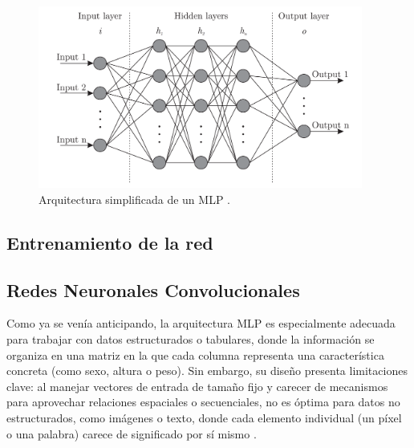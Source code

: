 \begin{figure}[h]
    \centering
    \includegraphics[width=0.95\textwidth]{capitulos/cap_02/imagenes/neural_network.png}
    \caption{Arquitectura simplificada de un MLP \cite{bre2017}.} 
    \label{fig:neural_network}
\end{figure}


\subsection{Entrenamiento de la red}



\subsection{Redes Neuronales Convolucionales}

Como ya se venía anticipando, la arquitectura MLP es especialmente adecuada para trabajar con datos 
estructurados o tabulares, donde la información se organiza en una matriz en la que cada columna representa 
una característica concreta (como sexo, altura o peso). 
Sin embargo, su diseño presenta limitaciones clave: al manejar vectores de entrada de tamaño fijo y carecer 
de mecanismos para aprovechar relaciones espaciales o secuenciales, no es óptima para datos no estructurados, 
como imágenes o texto, donde cada elemento individual (un píxel o una palabra) carece de significado por sí 
mismo \cite{murphy2022}.

